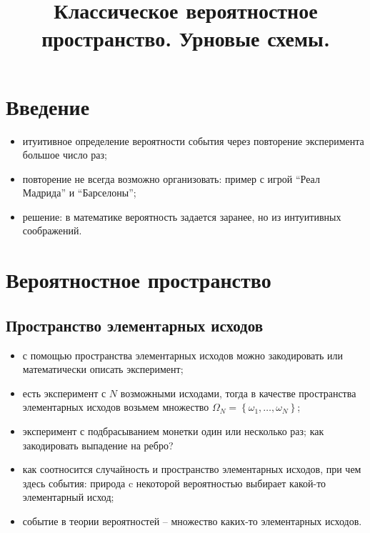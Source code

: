 

\title{Классическое вероятностное пространство. Урновые схемы.} 
\date{\vspace{-1cm}}


\maketitle

\section*{Введение}
\begin{itemize}
    \item
    итуитивное определение вероятности события через повторение эксперимента большое число раз;
    \item
    повторение не всегда возможно организовать: пример с игрой ``Реал Мадрида'' и ``Барселоны'';
    \item
    решение: в математике вероятность задается заранее, но из интуитивных соображений.
\end{itemize}

\section*{Вероятностное пространство}
\subsection*{Пространство элементарных исходов}
\begin{itemize}
    \item
    с помощью пространства элементарных исходов можно закодировать или математически описать эксперимент;
    \item
    есть эксперимент с $N$ возможными исходами, тогда в качестве пространства элементарных исходов возьмем множество $\Omega_N = \left\{\omega_1, \ldots, \omega_N\right\}$;
    \item
    эксперимент с подбрасыванием монетки один или несколько раз;
    как закодировать выпадение на ребро?
    \item
    как соотносится случайность и пространство элементарных исходов, при чем здесь события: природа c некоторой вероятностью выбирает какой-то элементарный исход;
    \item
    событие в теории вероятностей -- множество каких-то элементарных исходов.
\end{itemize}

